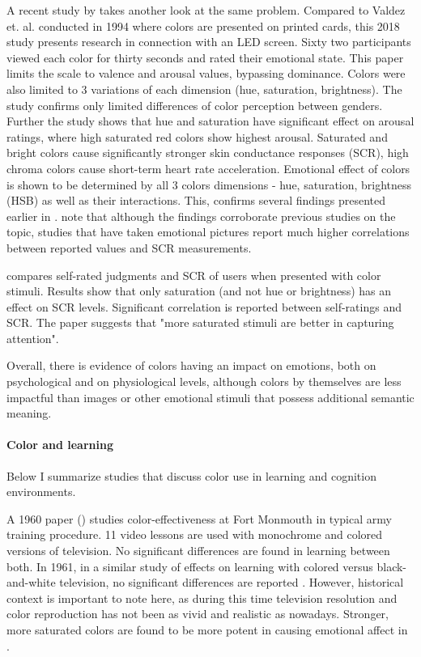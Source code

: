 		A recent study by \cite{Wilms2018} takes another look at the same problem. Compared to Valdez et. al. conducted in 1994 where colors are presented on printed cards, this 2018 study presents research in connection with an LED screen. Sixty two participants viewed each color for thirty seconds and rated their emotional state. This paper limits the scale to valence and arousal values, bypassing dominance. Colors were also limited to 3 variations of each dimension (hue, saturation, brightness). The study confirms only limited differences of color perception between genders. Further the study shows that hue and saturation have significant effect on arousal ratings, where high saturated red colors show highest arousal. Saturated and bright colors cause significantly stronger skin conductance responses (SCR), high chroma colors cause short-term heart rate acceleration. Emotional effect of colors is shown to be determined by all 3 colors dimensions - hue, saturation, brightness (HSB) as well as their interactions. This, confirms several findings presented earlier in \cite{Valdez1994}. \cite{Wilms2018} note that although the findings corroborate previous studies on the topic, studies that have taken emotional pictures report much higher correlations between reported values and SCR measurements.
				
		\cite{Zielinski2016} compares self-rated judgments and SCR of users when presented with color stimuli. Results show that only saturation (and not hue or brightness) has an effect on SCR levels. Significant correlation is reported between self-ratings and SCR. The paper suggests that "more saturated stimuli are better in capturing attention".
		
		Overall, there is evidence of colors having an impact on emotions, both on psychological and on physiological levels, although colors by themselves are less impactful than images or other emotional stimuli that possess additional semantic meaning.
		
		
		\paragraph{Color and learning} Below I summarize studies that discuss color use in learning and cognition environments.
		
		A 1960 paper (\cite{Kanner1960}) studies color-effectiveness at Fort Monmouth in typical army training procedure. 11 video lessons are used with monochrome and colored versions of television. No significant differences are found in learning between both. In 1961, in a similar study of effects on learning with colored versus black-and-white television, no significant differences are reported \cite{Pett1996}.
		However, historical context is important to note here, as during this time television resolution and color reproduction has not been as vivid and realistic as nowadays. Stronger, more saturated colors are found to be more potent in causing emotional affect in \cite{Valdez1994}.
		
